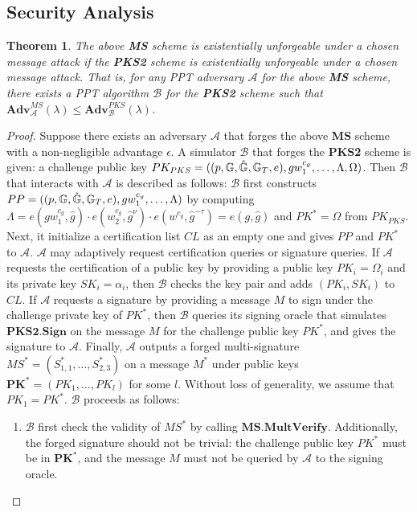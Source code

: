 \documentclass[11pt,letterpaper]{article}
\newcommand{\vect}[1]{\mathbf{#1}}
\newtheorem{theorem}{Theorem}[section]
\newcommand{\G}{\mathbb{G}}
\newcommand{\Adv}{\textbf{Adv}}
\newcommand{\mc}[1]{\mathcal{#1}}
\newcommand{\tb}[1]{\textbf{#1}}
\newcommand{\lb}{\linebreak[0]}
\begin{document}
\subsection{Security Analysis}

\begin{theorem} \label{thm:ms-prime}
The above \tb{MS} scheme is existentially unforgeable under a chosen message
attack if the \tb{PKS2} scheme is existentially unforgeable under a chosen
message attack. That is, for any PPT adversary $\mc{A}$ for the above \tb{MS}
scheme, there exists a PPT algorithm $\mc{B}$ for the \tb{PKS2} scheme such
that
    $\Adv_{\mc{A}}^{MS}(\lambda) \leq \Adv_{\mc{B}}^{PKS}(\lambda)$.
\end{theorem}

\begin{proof}
Suppose there exists an adversary $\mc{A}$ that forges the above \tb{MS}
scheme with a non-negligible advantage $\epsilon$. A simulator $\mc{B}$ that
forges the \tb{PKS2} scheme is given: a challenge public key $PK_{PKS} = (
(p, \G, \hat{\G}, \G_T, e), \lb g w_1^{c_g}, \ldots, \Lambda, \Omega )$. Then
$\mc{B}$ that interacts with $\mc{A}$ is described as follows:
$\mc{B}$ first constructs $PP = ( (p, \G, \hat{\G}, \G_T, e), \lb g
w_1^{c_g}, \ldots, \Lambda )$ by computing $\Lambda = e(gw_1^{c_g}, \hat{g})
\cdot e(w_2^{c_g}, \hat{g}^{\nu}) \cdot e(w^{c_g}, \hat{g}^{-\tau}) = e(g,
\hat{g})$ and $PK^* = \Omega$ from $PK_{PKS}$. Next, it initialize a
certification list $CL$ as an empty one and gives $PP$ and $PK^*$ to
$\mc{A}$.
$\mc{A}$ may adaptively request certification queries or signature queries.
If $\mc{A}$ requests the certification of a public key by providing a public
key $PK_i = \Omega_i$ and its private key $SK_i = \alpha_i$, then $\mc{B}$
checks the key pair and adds $(PK_i, SK_i)$ to $CL$.
If $\mc{A}$ requests a signature by providing a message $M$ to sign under the
challenge private key of $PK^*$, then $\mc{B}$ queries its signing oracle
that simulates $\tb{PKS2.Sign}$ on the message $M$ for the challenge public
key $PK^*$, and gives the signature to $\mc{A}$.
Finally, $\mc{A}$ outputs a forged multi-signature $MS^* = (S_{1,1}^*,
\ldots, S_{2,3}^*)$ on a message $M^*$ under public keys $\vect{PK}^* =
(PK_1, \ldots, PK_l)$ for some $l$. Without loss of generality, we assume
that $PK_1 = PK^*$. $\mc{B}$ proceeds as follows:
\begin{enumerate}
\item $\mc{B}$ first check the validity of $MS^*$ by calling
    $\tb{MS.MultVerify}$. Additionally, the forged signature should not be
    trivial: the challenge public key $PK^*$ must be in $\vect{PK}^*$, and
    the message $M$ must not be queried by $\mc{A}$ to the signing oracle.


\end{enumerate}
\end{proof}
\end{document}
